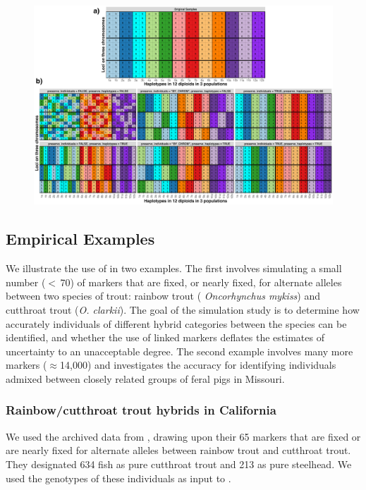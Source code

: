 {{}
\begin{figure}
\includegraphics[width=\textwidth]{figures/permutations-plot.png}
\caption[\permcap]{\permcap}
\label{fig:perms}
\end{figure}

\subsection*{Empirical Examples}

We illustrate the use of \gscramble{} in two examples.  The first involves
simulating a small number ($<\,$70) of markers that are fixed, or nearly
fixed, for alternate alleles between two species of trout: rainbow trout ({\em 
Oncorhynchus mykiss}) and cutthroat trout ({\em O. clarkii}). The goal of the 
simulation study is to determine how accurately individuals of different hybrid
categories between the species can be identified, and whether the use of linked 
markers deflates the estimates of uncertainty to an unacceptable degree.  The 
second example involves many more markers ($\approx$14,000) and 
investigates the accuracy for
identifying individuals admixed between closely related groups of feral
pigs in Missouri.  

\subsubsection*{Rainbow/cutthroat trout hybrids in California}

We used the archived data from \citet{rizza2023limited}, drawing upon their 65 markers
that are fixed or are nearly fixed for alternate alleles between rainbow trout and cutthroat trout.
They designated 634 fish as pure cutthroat trout and 213 as pure steelhead.  We used the
genotypes of these individuals as input to \gscramble{}.

}

